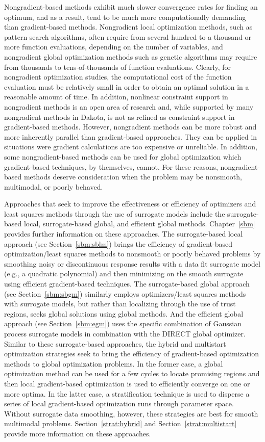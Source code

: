 Nongradient-based methods exhibit much slower convergence rates for
finding an optimum, and as a result, tend to be much more
computationally demanding than gradient-based methods. Nongradient
local optimization methods, such as pattern search algorithms, often
require from several hundred to a thousand or more function
evaluations, depending on the number of variables, and nongradient
global optimization methods such as genetic algorithms may require
from thousands to tens-of-thousands of function evaluations. Clearly,
for nongradient optimization studies, the computational cost of the
function evaluation must be relatively small in order to obtain an
optimal solution in a reasonable amount of time. In addition,
nonlinear constraint support in nongradient methods is an open area of
research and, while supported by many nongradient methods in Dakota,
is not as refined as constraint support in gradient-based
methods. However, nongradient methods can be more robust and more
inherently parallel than gradient-based approaches. They can be
applied in situations were gradient calculations are too expensive or
unreliable. In addition, some nongradient-based methods can be used
for global optimization which gradient-based techniques, by
themselves, cannot. For these reasons, nongradient-based methods
deserve consideration when the problem may be nonsmooth, multimodal,
or poorly behaved.

Approaches that seek to improve the effectiveness or efficiency of
optimizers and least squares methods through the use of surrogate
models include the surrogate-based local, surrogate-based global, and
efficient global methods.  Chapter~\ref{sbm} provides further
information on these approaches.  The surrogate-based local approach
(see Section~\ref{sbm:sblm}) brings the efficiency of gradient-based
optimization/least squares methods to nonsmooth or poorly behaved
problems by smoothing noisy or discontinuous response results with a
data fit surrogate model (e.g., a quadratic polynomial) and then
minimizing on the smooth surrogate using efficient gradient-based
techniques.  The surrogate-based global approach (see
Section~\ref{sbm:sbgm}) similarly employs optimizers/least squares
methods with surrogate models, but rather than localizing through the
use of trust regions, seeks global solutions using global methods.
And the efficient global approach (see Section~\ref{sbm:egm}) uses the
specific combination of Gaussian process surrogate models in
combination with the DIRECT global optimizer.  Similar to these
surrogate-based approaches, the hybrid and multistart optimization
strategies seek to bring the efficiency of gradient-based optimization
methods to global optimization problems.  In the former case, a global
optimization method can be used for a few cycles to locate promising
regions and then local gradient-based optimization is used to
efficiently converge on one or more optima. In the latter case, a
stratification technique is used to disperse a series of local
gradient-based optimization runs through parameter space.  Without
surrogate data smoothing, however, these strategies are best for
smooth multimodal problems. Section~\ref{strat:hybrid} and
Section~\ref{strat:multistart} provide more information on these
approaches.

